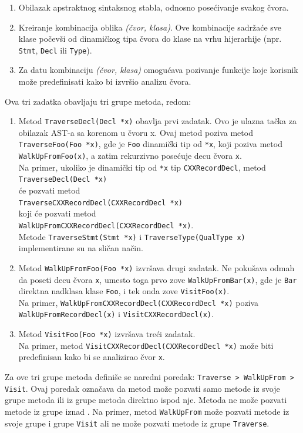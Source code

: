 \documentclass[12pt,oneside]{memoir}
\begin{document}
\begin{enumerate}
\item Obilazak apstraktnog sintaksnog stabla, odnosno pose\'{c}ivanje svakog \v{c}vora.
\item Kreiranje kombinacija oblika \textit{(\v{c}vor, klasa)}. Ove kombinacije sadr\v{z}a\'{c}e sve klase počevši od dinamičkog tipa čvora do klase na vrhu hijerarhije (npr. \texttt{Stmt}, \texttt{Decl} ili \texttt{Type}).
\item Za datu kombinaciju \textit{(čvor, klasa)} omogu\'{c}ava pozivanje funkcije koje korisnik može predefinisati kako bi izvr\v{s}io analizu čvora.
\end{enumerate}
Ova tri zadatka obavljaju tri grupe metoda, redom:
\begin{enumerate}
  \item Metod \texttt{TraverseDecl(Decl *x)} obavlja prvi zadatak. Ovo je ulazna tačka za obilazak AST-a sa korenom u čvoru x. Ovaj metod poziva metod \\ \texttt{TraverseFoo(Foo *x)}, gde je \texttt{Foo} dinamički tip od \texttt{*x}, koji poziva metod \\ \texttt{WalkUpFromFoo(x)}, a zatim rekurzivno posećuje decu čvora \texttt{x}. \\
  Na primer, ukoliko je dinami\v{c}ki tip od \texttt{*x} tip \texttt{CXXRecordDecl}, metod \\ \texttt{TraverseDecl(Decl *x)} \\ \'{c}e pozvati metod \\ \texttt{TraverseCXXRecordDecl(CXXRecordDecl *x)} \\ koji \'{c}e pozvati metod \\ \texttt{WalkUpFromCXXRecordDecl(CXXRecordDecl *x)}. \\ Metode \texttt{TraverseStmt(Stmt *x)} i \texttt{TraverseType(QualType x)} implementirane su na sličan način.
 
\item Metod \texttt{WalkUpFromFoo(Foo *x)} izvršava drugi zadatak. Ne pokušava odmah da poseti decu čvora \texttt{x}, umesto toga prvo zove \texttt{WalkUpFromBar(x)}, gde je \texttt{Bar} direktna nadklasa klase \texttt{Foo}, i tek onda zove \texttt{VisitFoo(x)}. \\
Na primer, \texttt{WalkUpFromCXXRecordDecl(CXXRecordDecl *x)} poziva \\ \texttt{WalkUpFromRecordDecl(x)} i \texttt{VisitCXXRecordDecl(x)}.
\item Metod \texttt{VisitFoo(Foo *x)} izvršava tre\'{c}i zadatak. \\Na primer, metod \texttt{VisitCXXRecordDecl(CXXRecordDecl *x)} mo\v{z}e biti predefinisan kako bi se analizirao \v{c}vor \texttt{x}.
\end{enumerate}
Za ove tri grupe metoda defini\v{s}e se naredni poredak: \texttt{Traverse > WalkUpFrom > Visit}. Ovaj poredak ozna\v{c}ava da metod mo\v{z}e pozvati samo metode iz svoje grupe metoda ili iz grupe metoda direktno ispod nje. Metoda ne mo\v{z}e pozvati metode iz grupe iznad \cite{visitors}. Na primer, metod \texttt{WalkUpFrom} mo\v{z}e pozvati metode iz svoje grupe i grupe \texttt{Visit} ali 
ne mo\v{z}e pozvati metode iz grupe \texttt{Traverse}.
\end{document}
